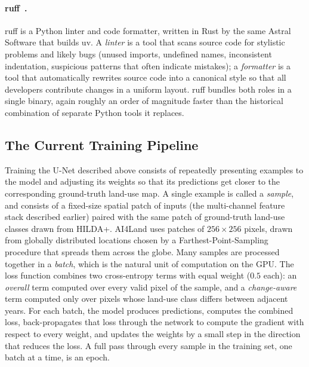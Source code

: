 \documentclass[12pt,a4paper]{article}
\begin{document}
\paragraph{ruff~\cite{ruff}.} ruff is a Python linter and code formatter, written in Rust by
the same Astral Software that builds uv. A \emph{linter} is a tool that scans source code
for stylistic problems and likely bugs (unused imports, undefined names, inconsistent
indentation, suspicious patterns that often indicate mistakes); a \emph{formatter} is a tool
that automatically rewrites source code into a canonical style so that all developers
contribute changes in a uniform layout. ruff bundles both roles in a single binary, again
roughly an order of magnitude faster than the historical combination of separate Python tools
it replaces.

\subsection{The Current Training Pipeline}\label{sec:current-pipeline}

Training the U-Net described above consists of repeatedly presenting examples to the model
and adjusting its weights so that its predictions get closer to the corresponding ground-truth
land-use map. A single example is called a \emph{sample}, and consists of a fixed-size
spatial patch of inputs (the multi-channel feature stack described earlier)
paired with the same patch of ground-truth land-use classes drawn from HILDA+. AI4Land uses
patches of $256 \times 256$ pixels, drawn from globally distributed locations chosen by a
Farthest-Point-Sampling procedure that spreads them across the globe. Many samples are
processed together in a \emph{batch}, which is the natural unit of computation on the GPU. The
loss function combines two cross-entropy terms with equal weight ($0.5$ each): an
\emph{overall} term computed over every valid pixel of the sample, and a \emph{change-aware}
term computed only over pixels whose land-use class differs between adjacent years. For each batch, the model produces predictions, computes the combined loss,
back-propagates that loss through the network to compute the gradient with respect to every
weight, and updates the weights by a small step in the direction that reduces the loss. A full
pass through every sample in the training set, one batch at a time, is an epoch.
\end{document}
